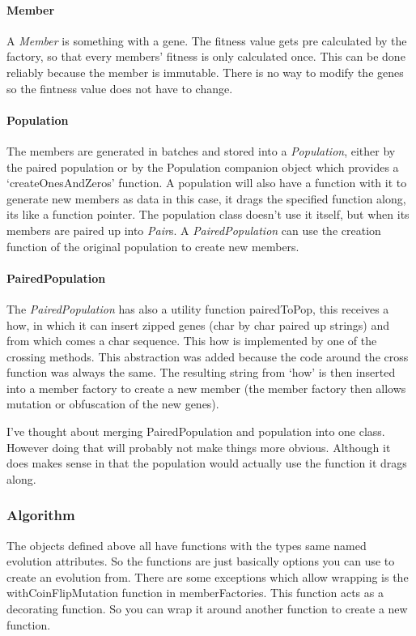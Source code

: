 \documentclass{article}
\begin{document}
\begin{empfile}
\paragraph{Member} A \emph{Member} is something with a gene. The fitness value gets pre calculated by
the factory, so that every members' fitness is only calculated once. This can
be done reliably because the member is immutable. There is no way to modify
the genes so the fintness value does not have to change.

\paragraph{Population} The members are generated in batches and stored into a
\emph{Population}, either by the paired
population or by the Population companion object which provides a
`createOnesAndZeros' function.
A population will also have a function with it to generate new members as
data in this case, it drags the specified function along, its like a
function pointer.
The population class doesn't use it itself, but when its members are paired
up into \emph{Pair}s. A \emph{PairedPopulation} can use the creation function
of the original population to create new members.

\paragraph{PairedPopulation}
The \emph{PairedPopulation} has also a utility function pairedToPop,
this receives a how, in which it can
insert zipped genes (char by char paired up strings) and from which comes
a char sequence. This how is implemented by one of the crossing methods.
This abstraction was added because the code around the cross function was
always the same.
The resulting string from `how' is then inserted into a member
factory to create a new member (the member factory then allows mutation
or obfuscation of the new genes).

I've thought about merging PairedPopulation and population into
one class. However doing that will probably not make things more obvious.
Although it does makes sense in that the population would actually use
the function it drags along.

\newpage
\subsubsection{Algorithm}
The objects defined above all have functions with the types
same named evolution attributes. So the functions are just basically
options you can use to create an
evolution from. There are some exceptions which allow wrapping is the
withCoinFlipMutation function in
memberFactories. This function acts as a decorating function. So you can wrap
it around another function to create a new function.


\end{empfile}
\end{document}
